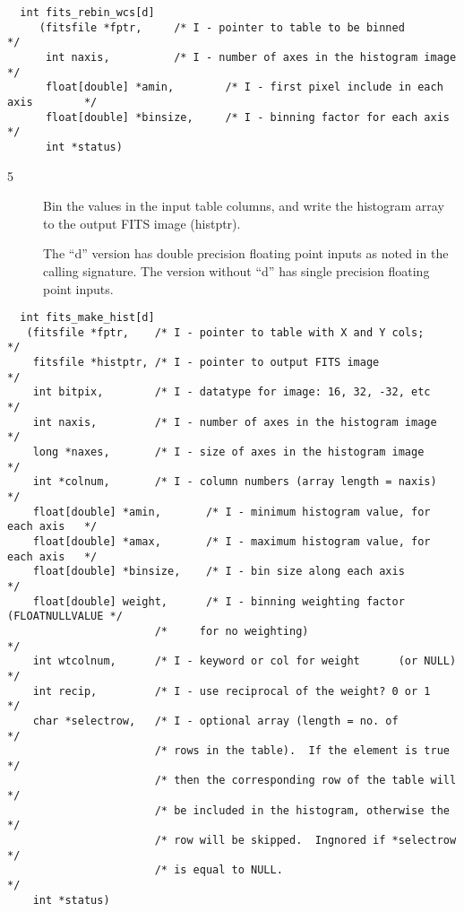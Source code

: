 \documentclass[11pt]{book}
\begin{document}
\begin{verbatim}
  int fits_rebin_wcs[d]
     (fitsfile *fptr,     /* I - pointer to table to be binned           */
      int naxis,          /* I - number of axes in the histogram image   */
      float[double] *amin,        /* I - first pixel include in each axis        */
      float[double] *binsize,     /* I - binning factor for each axis            */
      int *status)
\end{verbatim}


\begin{description}
\item[5 ] Bin the values in the input table columns, and write the histogram
array to the output FITS image (histptr).

The ``d'' version has double precision floating point inputs as noted
in the calling signature.  The version without ``d'' has single
precision floating point inputs.
 \label{makehist}
\end{description}

\begin{verbatim}
  int fits_make_hist[d]
   (fitsfile *fptr,    /* I - pointer to table with X and Y cols;      */
    fitsfile *histptr, /* I - pointer to output FITS image             */
    int bitpix,        /* I - datatype for image: 16, 32, -32, etc     */
    int naxis,         /* I - number of axes in the histogram image    */
    long *naxes,       /* I - size of axes in the histogram image      */
    int *colnum,       /* I - column numbers (array length = naxis)    */
    float[double] *amin,       /* I - minimum histogram value, for each axis   */
    float[double] *amax,       /* I - maximum histogram value, for each axis   */
    float[double] *binsize,    /* I - bin size along each axis                 */
    float[double] weight,      /* I - binning weighting factor (FLOATNULLVALUE */
                       /*     for no weighting)                        */
    int wtcolnum,      /* I - keyword or col for weight      (or NULL) */
    int recip,         /* I - use reciprocal of the weight? 0 or 1     */
    char *selectrow,   /* I - optional array (length = no. of          */
                       /* rows in the table).  If the element is true  */
                       /* then the corresponding row of the table will */
                       /* be included in the histogram, otherwise the  */
                       /* row will be skipped.  Ingnored if *selectrow */
                       /* is equal to NULL.                            */
    int *status)
\end{verbatim}
\end{document}
